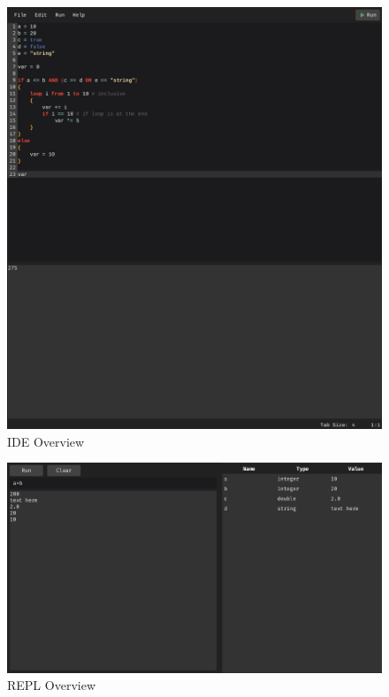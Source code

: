 \documentclass[
]{report}
\begin{document}
\begin{appendices}
	\begin{figure}
		\centering
		\includegraphics[width=\textwidth]{ide-overview}
		\caption{IDE Overview}
		\label{fig:ide-overview}
	\end{figure}
	\begin{figure}
		\centering
		\includegraphics[width=\textwidth]{repl-overview}
		\caption{REPL Overview}
		\label{fig:repl-overview}
	\end{figure}


\end{appendices}
\end{document}

